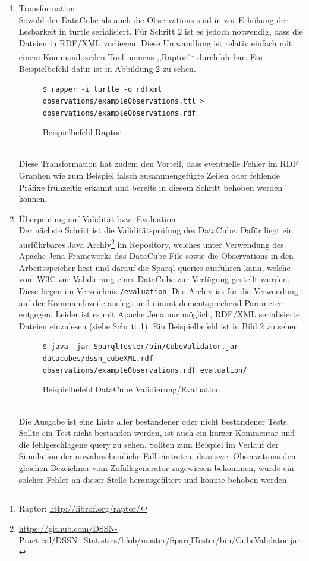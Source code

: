 \documentclass{article}
\begin{document}
\begin{enumerate}
	\item{Transformation\\
	Sowohl der DataCube als auch die Observations sind in zur Erhöhung der Lesbarkeit in turtle serialisiert. Für Schritt 2 ist es jedoch notwendig, dass die Dateien in RDF/XML vorliegen. Diese Umwandlung ist relativ einfach mit einem Kommandozeilen Tool namens ,,Raptor''\footnote{Raptor: \url{http://librdf.org/raptor/}} durchführbar. Ein Beispielbefehl dafür ist in Abbildung 2 zu sehen.
	\begin{figure}[ht]
	\centering
	\texttt{\$ rapper -i turtle -o rdfxml observations/exampleObservations.ttl  > observations/exampleObservations.rdf}
	\caption{Beispielbefehl Raptor}
	\end{figure}
	}\\
	Diese Transformation hat zudem den Vorteil, dass eventuelle Fehler im RDF Graphen wie zum Beispiel falsch zusammengefügte Zeilen oder fehlende Präfixe frühzeitig erkannt und bereits in diesem Schritt behoben werden können.\\
	\item{Überprüfung auf Validität bzw. Evaluation\\
	Der nächste Schritt ist die Validitätsprüfung des DataCube. Dafür liegt ein ausführbares Java Archiv\footnote{\url{https://github.com/DSSN-Practical/DSSN_Statistics/blob/master/SparqlTester/bin/CubeValidator.jar}} im Repository, welches unter Verwendung des Apache Jena Frameworks das DataCube File sowie die Observations in den Arbeitsspeicher liest und darauf die Sparql queries ausführen kann, welche vom W3C zur Validierung eines DataCube zur Verfügung gestellt wurden. Diese liegen im Verzeichnis \texttt{/evaluation}. Das Archiv ist für die Verwendung auf der Kommandozeile auslegt und nimmt dementsprechend Parameter entgegen. Leider ist es mit Apache Jena nur möglich, RDF/XML serialisierte Dateien einzulesen (siehe Schritt 1). Ein Beispielbefehl ist in Bild 2 zu sehen.\\
	\begin{figure}[ht]
	\centering
	\texttt{\$ java -jar SparqlTester/bin/CubeValidator.jar datacubes/dssn\_cubeXML.rdf observations/exampleObservations.rdf evaluation/}
	\caption{Beispielbefehl DataCube Validierung/Evaluation}
	\end{figure}\\
	Die Ausgabe ist eine Liste aller bestandener oder nicht bestandener Tests. Sollte ein Test nicht bestanden werden, ist auch ein kurzer Kommentar und die fehlgeschlagene query zu sehen. Sollten zum Beispiel im Verlauf der Simulation der unwahrscheinliche Fall eintreten, dass zwei Observations den gleichen Bezeichner vom Zufallsgenerator zugewiesen bekommen, würde ein solcher Fehler an dieser Stelle herausgefiltert und könnte behoben werden.
}
\end{enumerate}
\end{document}

